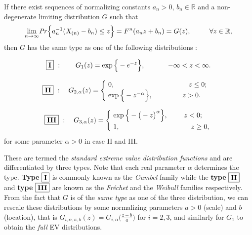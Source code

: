\begin{theorem} \label{extthm}
 If there exist sequences of normalizing constants $a_n>0$, $b_n\in\mathbb{R}$ and a non-degenerate limiting distribution $G$ such that 
	\begin{equation} \label{exttheom}
	\displaystyle{\lim_{n \to \infty}}\text{\emph{Pr}}\Big\{ a_n^{-1}(X_{(n)}-b_n)\leq z\Big\}=F^n(a_nz+b_n)
	= G(z), \ \ \ \ \ \ \ \ \forall z\in\mathbb{R},
	\end{equation}
then $G$ has the same type as one of the following distributions : 

\begin{equation}\label{gumb}
\boxed{\textbf{\text{I}}}\ : \qquad G_{1}(z)= 
\exp\Big\{-e^{-z}\Big\}, \ \ \quad \quad \ \ -\infty<z<\infty.    
\end{equation}


\begin{equation} \label{frech}
\boxed{\textbf{\text{II}}} \  :  \quad G_{2,\alpha}(z)=
\begin{cases}
\ 0, \ \ \ \ \ \ \ \ \ \ \ \qquad \quad \ \ \ \ \ \ \ \quad \ \ z\leq 0; \\
\ \exp\Big\{-z^{-\alpha}\Big\}, \ \ \ \quad \ \quad \ \ \ z>0.    
\end{cases}
\end{equation}

\begin{equation} \label{weib}
\ \ \boxed{\textbf{\text{III}}} \ :  \quad G_{3,\alpha}(z)=\begin{cases}
\ \exp\Big\{-\big(-z\big)^{\alpha}\Big\}, \quad \quad \   z<0;     \\
\  1, \ \ \ \ \ \ \qquad \quad \quad \ \ \ \ \ \ \ \ \  \   \quad z\geq 0,
\end{cases}
\end{equation}
for some parameter $\alpha>0$ in case II and III.
\end{theorem}

These are termed the \emph{standard extreme value distribution functions} and are differentiated by three types. Note that each real parameter $\alpha$ determines the type. \textbf{Type} $\boxed{\textbf{\text{I}}}$ is commonly known as the \emph{Gumbel} family while the \textbf{type} $\boxed{\textbf{\text{II}}}$  and \textbf{type} $\boxed{\textbf{\text{III}}}$ are known as the \emph{Fréchet} and the \emph{Weibull} families respectively. From the fact that $G$ is of the \emph{same type} as one of the three distribution, we can rescale these distributions by some normalizing parameters $a>0$ (scale) and $b$ (location), that is $G_{i,\alpha, a,b}(z)=G_{i,\alpha}\Big(\frac{z-b}{a}\Big)$ for $i=2,3$, and similarly for $G_1$ to obtain the \emph{full} EV distributions. %


